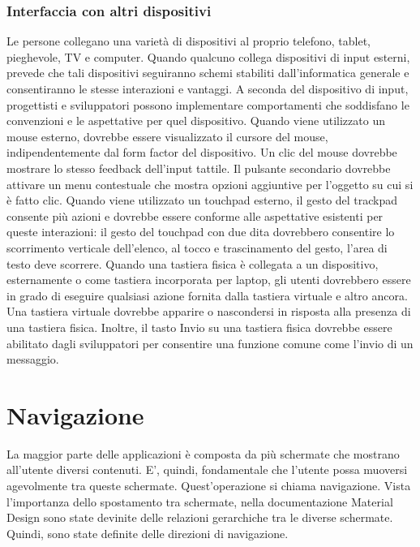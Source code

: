 \documentclass[12pt, a4paper]{report}
\begin{document}
		\subsubsection{Interfaccia con altri dispositivi}
		Le persone collegano una varietà di dispositivi al proprio telefono, tablet, pieghevole, TV e computer. Quando qualcuno collega dispositivi di input esterni, prevede che tali dispositivi seguiranno schemi stabiliti dall'informatica generale e consentiranno le stesse interazioni e vantaggi.
		A seconda del dispositivo di input, progettisti e sviluppatori possono implementare comportamenti che soddisfano le convenzioni e le aspettative per quel dispositivo. Quando viene utilizzato un mouse esterno, dovrebbe essere visualizzato il cursore del mouse, indipendentemente dal form factor del dispositivo.
		Un clic del mouse dovrebbe mostrare lo stesso feedback dell'input tattile. Il pulsante secondario dovrebbe attivare un menu contestuale che mostra opzioni aggiuntive per l'oggetto su cui si è fatto clic. Quando viene utilizzato un touchpad esterno, il gesto del trackpad consente più azioni e dovrebbe essere conforme alle aspettative esistenti per queste interazioni:
		il gesto del touchpad con due dita dovrebbero consentire lo scorrimento verticale dell'elenco, al tocco e trascinamento del gesto, l'area di testo deve scorrere.
		Quando una tastiera fisica è collegata a un dispositivo, esternamente o come tastiera incorporata per laptop, gli utenti dovrebbero essere in grado di eseguire qualsiasi azione fornita dalla tastiera virtuale e altro ancora. Una tastiera virtuale dovrebbe apparire o nascondersi in risposta alla presenza di una tastiera fisica.
		Inoltre, il tasto Invio su una tastiera fisica dovrebbe essere abilitato dagli sviluppatori per consentire una funzione comune come l'invio di un messaggio.



		\section{Navigazione}
    	La maggior parte delle applicazioni è composta da più schermate che mostrano all’utente diversi contenuti. E', quindi, fondamentale che l’utente possa muoversi
        agevolmente tra queste schermate. Quest’operazione si chiama navigazione. Vista l’importanza dello spostamento tra schermate, nella documentazione Material Design
        sono state devinite delle relazioni gerarchiche tra le diverse schermate. Quindi, sono state definite delle direzioni di navigazione.
\end{document}
